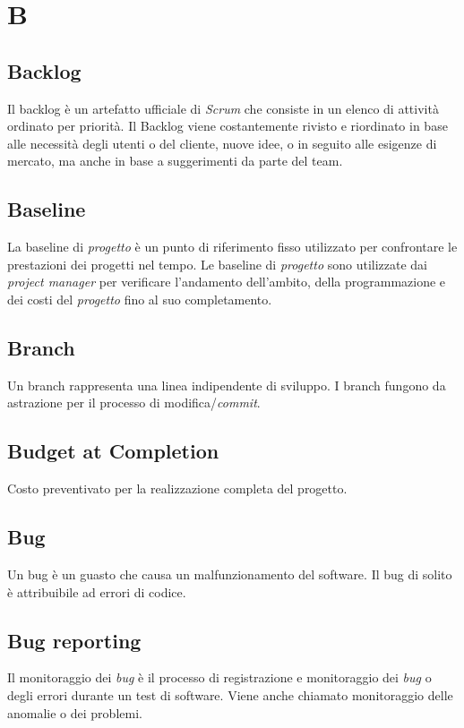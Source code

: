 \chapter{B}

\section{Backlog}
Il backlog è un artefatto ufficiale di \emph{Scrum} che consiste in un elenco di attività ordinato per priorità. Il Backlog viene costantemente rivisto e riordinato in base alle necessità degli utenti o del cliente, nuove idee, o in seguito alle esigenze di mercato, ma anche in base a suggerimenti da parte del team.

\section{Baseline}
La baseline di \emph{progetto} è un punto di riferimento fisso utilizzato per confrontare le prestazioni dei progetti nel tempo. Le baseline di \emph{progetto} sono utilizzate dai \emph{project manager} per verificare l'andamento dell'ambito, della programmazione e dei costi del \emph{progetto} fino al suo completamento.

\section{Branch}
Un branch rappresenta una linea indipendente di sviluppo. I branch fungono da astrazione per il processo di modifica/\emph{commit}.

\section{Budget at Completion}
Costo preventivato per la realizzazione completa del progetto.

\section{Bug}
Un bug è un guasto che causa un malfunzionamento del software. Il bug di solito è attribuibile ad errori di codice.

\section{Bug reporting}
Il monitoraggio dei \emph{bug} è il processo di registrazione e monitoraggio dei \emph{bug} o degli errori durante un test di software. Viene anche chiamato monitoraggio delle anomalie o dei problemi.
